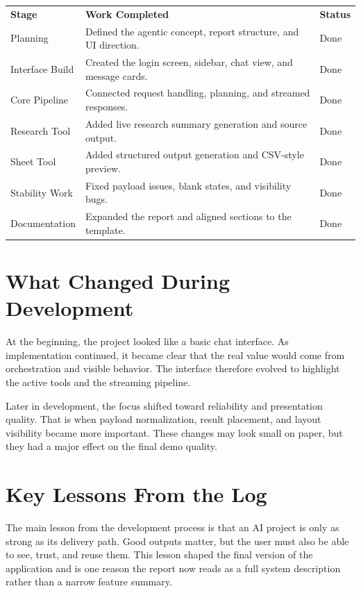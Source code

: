 \documentclass[11pt,oneside]{report}
\begin{document}
\begin{longtable}{p{}p{}p{}}
\textbf{Stage} & \textbf{Work Completed} & \textbf{Status} \\
Planning & Defined the agentic concept, report structure, and UI direction. & Done \\
Interface Build & Created the login screen, sidebar, chat view, and message cards. & Done \\
Core Pipeline & Connected request handling, planning, and streamed responses. & Done \\
Research Tool & Added live research summary generation and source output. & Done \\
Sheet Tool & Added structured output generation and CSV-style preview. & Done \\
Stability Work & Fixed payload issues, blank states, and visibility bugs. & Done \\
Documentation & Expanded the report and aligned sections to the template. & Done \\
\end{longtable}

\section{What Changed During Development}
At the beginning, the project looked like a basic chat interface. As implementation continued, it became clear that the real value would come from orchestration and visible behavior. The interface therefore evolved to highlight the active tools and the streaming pipeline.

Later in development, the focus shifted toward reliability and presentation quality. That is when payload normalization, result placement, and layout visibility became more important. These changes may look small on paper, but they had a major effect on the final demo quality.

\section{Key Lessons From the Log}
The main lesson from the development process is that an AI project is only as strong as its delivery path. Good outputs matter, but the user must also be able to see, trust, and reuse them. This lesson shaped the final version of the application and is one reason the report now reads as a full system description rather than a narrow feature summary.
\end{document}
